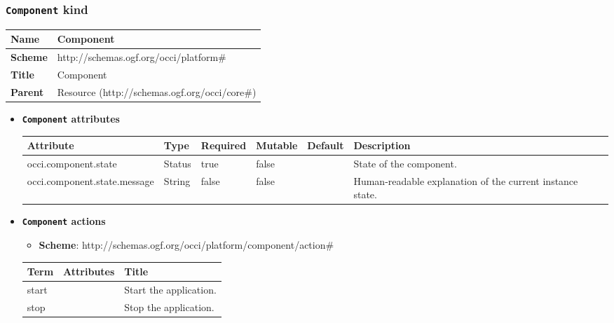 \subsubsection{\texttt{Component} kind}
\begin{center}
\begin{tabular}{|l|l|}
  \hline
  \textbf{Name} & Component \\
  \hline  
  \textbf{Scheme} & http://schemas.ogf.org/occi/platform\# \\
  \hline
  \textbf{Title} & Component \\
  \hline
  \textbf{Parent} & Resource (http://schemas.ogf.org/occi/core\#) \\
  \hline
\end{tabular}
\end{center}
\begin{itemize}
\item \textbf{\texttt{Component} attributes}

\begin{tabularx}{\textwidth}{|l|l|p{1.4cm}|p{1.3cm}|l|X|}
  \hline
  \textbf{Attribute} & \textbf{Type} & \textbf{Required} & \textbf{Mutable} & \textbf{Default} & \textbf{Description} \\
  \hline  
  occi.component.state & Status & true & false &  & State of the component. \\
  \hline
  occi.component.state.message & String & false & false &  & Human-readable explanation of the current instance state. \\
  \hline
\end{tabularx}
\end{itemize}

\begin{itemize}
\item \textbf{\texttt{Component} actions}

\begin{itemize}
	\item \textbf{Scheme}: http://schemas.ogf.org/occi/platform/component/action\#
\end{itemize}
\begin{tabularx}{\textwidth}{|l|l|X|}
  \hline
  \textbf{Term}  & \textbf{Attributes} & \textbf{Title} \\
  \hline  
  start & & Start the application. \\
  \hline
  stop & & Stop the application. \\
  \hline
\end{tabularx}
\end{itemize}


